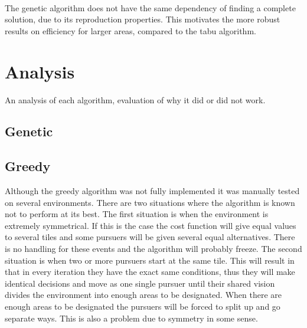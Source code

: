 \\The genetic algorithm does not have the same dependency of finding a complete solution, due to its reproduction properties. This motivates the more robust results on efficiency for larger areas, compared to the tabu algorithm. 
	
\section{Analysis}
An analysis of each algorithm,  evaluation of why it did or did not work. \par

\subsection{Genetic}

\subsection{Greedy}
Although the greedy algorithm was not fully implemented it was manually tested on several environments. There are two situations where the algorithm is known not to perform at its best. The first situation is when the environment is extremely symmetrical. If this is the case the cost function will give equal values to several tiles and some pursuers will be given several equal alternatives. There is no handling for these events and the algorithm will probably freeze. The second situation is when two or more pursuers start at the same tile. This will result in that in every iteration they have the exact same conditions, thus they will make identical decisions and move as one single pursuer until their shared vision divides the environment into enough areas to be designated. When there are enough areas to be designated the pursuers will be forced to split up and go separate ways. This is also a problem due to symmetry in some sense.

